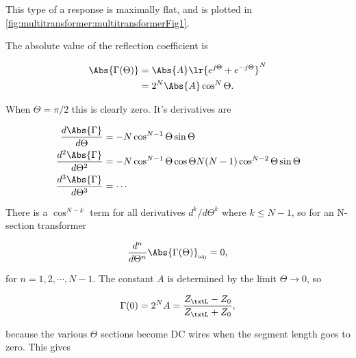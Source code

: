 This type of a response is maximally flat, and is plotted in \cref{fig:multitransformer:multitransformerFig1}.

The absolute value of the reflection coefficient is

\begin{equation}\label{eqn:uwavesDeck7MultisectionTransformersCore:160}
\begin{aligned}
\Abs{\Gamma(\Theta)}
&=
\Abs{A} \lr{ e^{j \Theta} + e^{- j \Theta} }^N
\\ &=
2^N \Abs{A} \cos^N\Theta.
\end{aligned}
\end{equation}

When \( \Theta = \pi/2 \) this is clearly zero.  It's derivatives are

\begin{equation}\label{eqn:uwavesDeck7MultisectionTransformersCore:180}
\begin{aligned}
\frac{d \Abs{\Gamma}}{d\Theta} &= -N \cos^{N-1} \Theta \sin\Theta \\
\frac{d^2 \Abs{\Gamma}}{d\Theta^2} &= -N \cos^{N-1} \Theta \cos\Theta N(N-1) \cos^{N-2} \Theta \sin\Theta  \\
\frac{d^3 \Abs{\Gamma}}{d\Theta^3} &= \cdots
\end{aligned}
\end{equation}

There is a \( \cos^{N-k} \) term for all derivatives \( d^k/d\Theta^k \) where \( k \le N-1 \), so for an N-section transformer

\begin{equation}\label{eqn:uwavesDeck7MultisectionTransformersCore:140}
\frac{d^n}{d\Theta^n} \Abs{\Gamma(\Theta)}_{\omega_0} = 0,
\end{equation}

for \( n = 1, 2, \cdots, N-1 \).  The constant \( A \) is determined by the limit \( \Theta \rightarrow 0 \), so

\begin{equation}\label{eqn:uwavesDeck7MultisectionTransformersCore:200}
\Gamma(0) = 2^N A = \frac{Z_\txtL - Z_0}{Z_\txtL + Z_0},
\end{equation}

because the various \( \Theta \) sections become DC wires when the segment length goes to zero.  This gives


